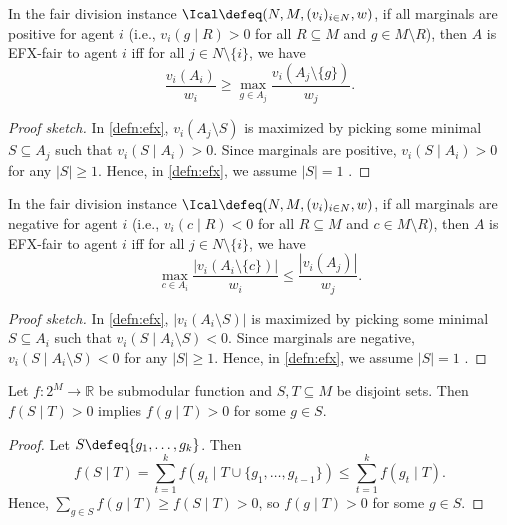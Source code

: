\begin{lemma}
\label{thm:efx-equiv-positive}
In the fair division instance $\Ical \defeq (N, M, (v_i)_{i \in N}, w)$,
if all marginals are positive for agent $i$
(i.e., $v_i(g \mid R) > 0$ for all $R \subseteq M$ and $g \in M \setminus R$),
then $A$ is EFX-fair to agent $i$ iff for all $j \in N \setminus \{i\}$, we have
\[ \frac{v_i(A_i)}{w_i} \ge \max_{g \in A_j} \frac{v_i(A_j \setminus \{g\})}{w_j}. \]
\end{lemma}
\begin{proof}[Proof sketch]
In \cref{defn:efx}, $v_i(A_j \setminus S)$ is maximized by picking
some minimal $S \subseteq A_j$ such that $v_i(S \mid A_i) > 0$.
Since marginals are positive, $v_i(S \mid A_i) > 0$ for any $|S| \ge 1$.
Hence, in \cref{defn:efx}, we assume $|S| = 1$ \wLoG{}.
\end{proof}

\begin{lemma}
\label{thm:efx-equiv-negative}
In the fair division instance $\Ical \defeq (N, M, (v_i)_{i \in N}, w)$,
if all marginals are negative for agent $i$
(i.e., $v_i(c \mid R) < 0$ for all $R \subseteq M$ and $c \in M \setminus R$),
then $A$ is EFX-fair to agent $i$ iff for all $j \in N \setminus \{i\}$, we have
\[ \max_{c \in A_i} \frac{|v_i(A_i \setminus \{c\})|}{w_i} \le \frac{|v_i(A_j)|}{w_j}. \]
\end{lemma}
\begin{proof}[Proof sketch]
In \cref{defn:efx}, $|v_i(A_i \setminus S)|$ is maximized by picking
some minimal $S \subseteq A_i$ such that $v_i(S \mid A_i \setminus S) < 0$.
Since marginals are negative, $v_i(S \mid A_i \setminus S) < 0$ for any $|S| \ge 1$.
Hence, in \cref{defn:efx}, we assume $|S| = 1$ \wLoG{}.
\end{proof}

\begin{lemma}
\label{thm:submod-positive-elem}
Let $f: 2^M \to \mathbb{R}$ be submodular function and $S, T \subseteq M$ be disjoint sets.
Then $f(S \mid T) > 0$ implies $f(g \mid T) > 0$ for some $g \in S$.
\end{lemma}
\begin{proof}
Let $S \defeq \{g_1, \ldots, g_k\}$. Then
\[ f(S \mid T) = \sum_{t=1}^k f(g_t \mid T \cup \{g_1, \ldots, g_{t-1}\})
    \le \sum_{t=1}^k f(g_t \mid T). \]
Hence, $\sum_{g \in S} f(g \mid T) \ge f(S \mid T) > 0$, so $f(g \mid T) > 0$ for some $g \in S$.
\end{proof}


